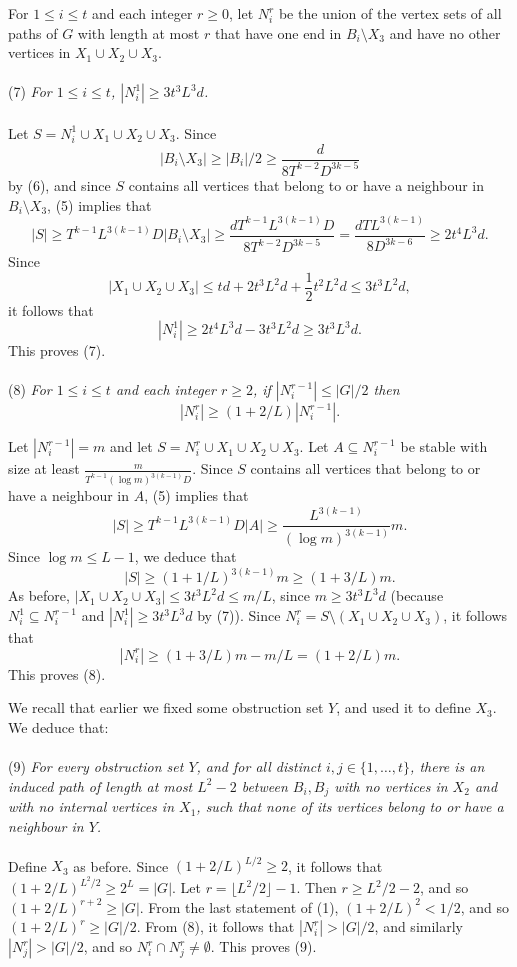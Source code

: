 \documentclass[titlepage,11pt]{article}
\def\LL{,\ldots,}
\begin{document}
For $1\le i\le t$ and each integer $r\ge 0$, let $N^r_i$ be the union of the vertex sets of all paths of $G$ with length at most $r$
that have one end in $B_i\setminus X_3$ and have  no other vertices in $X_1\cup X_2\cup X_3$.
\\
\\
(7) {\em For $1\le i\le t$, 
$|N_i^1|\ge 3t^3L^3d$.}
\\
\\
Let $S=N_i^1\cup X_1\cup X_2\cup X_3$. Since 
$$|B_i\setminus X_3|\ge |B_i|/2\ge \frac{d}{8T^{k-2}D^{3k-5}}$$ by (6), 
and since $S$ contains all vertices that belong to or have a neighbour in $B_i\setminus X_3$,
(5) implies that 
$$|S|\ge T^{k-1}L^{3(k-1)}D|B_i\setminus X_3|\ge \frac{dT^{k-1}L^{3(k-1)}D}{8T^{k-2}D^{3k-5}}=\frac{dTL^{3(k-1)}}{8D^{3k-6}}\ge 2t^4L^3d.$$
Since 
$$|X_1\cup X_2\cup X_3|\le td +  2t^3L^2d + \frac12 t^2L^2d\le 3t^3L^2d,$$
it follows that 
$$|N_i^1|\ge 2t^4L^3d - 3t^3L^2d\ge 3t^3L^3d.$$
This proves (7).
\\
\\
(8) {\em For $1\le i\le t$ and each integer $r\ge 2$, if $|N_i^{r-1}|\le |G|/2$ then 
$$|N^r_i|\ge \left(1+2/L\right)|N_i^{r-1}|.$$
}

\noindent
Let $|N_i^{r-1}|=m$ and let $S=N_i^{r}\cup X_1\cup X_2\cup X_3$. Let $A\subseteq N_i^{r-1}$ be stable with size at least 
$\frac{m}{T^{k-1}(\log m)^{3(k-1)}D}$. Since $S$ contains all vertices that belong to or have a neighbour in $A$, (5) implies that
$$|S|\ge T^{k-1}L^{3(k-1)}D|A|\ge \frac{L^{3(k-1)}}{(\log m)^{3(k-1)}}m.$$
Since $\log m\le L-1$, we deduce that 
$$|S|\ge \left(1+1/L\right)^{3(k-1)}m\ge (1+3/L)m.$$
As before, $|X_1\cup X_2\cup X_3|\le 3t^3L^2d\le m/L$, since
$m\ge 3t^3L^3d$ (because $N^1_i\subseteq N^{r-1}_i$ and $|N^1_i|\ge 3t^3L^3d$ by (7)).
Since
$N_i^r= S\setminus (X_1\cup X_2\cup X_3)$, it follows that 
$$|N_i^r|\ge \left(1+3/L\right)m-m/L= \left(1+2/L\right)m.$$
This proves (8).

\bigskip
We recall that earlier we fixed some obstruction set $Y$, and used it to define $X_3$. We deduce that:
\\
\\
(9) {\em For every obstruction set $Y$, and for all distinct $i,j\in \{1\LL t\}$, there is an induced path of length  
at most $L^2-2$
between $B_i,B_j$ with no vertices in $X_2$ and with no internal vertices in $X_1$, such that none of its vertices belong to or have a neighbour in $Y$.}
\\
\\
Define $X_3$ as before. 
Since $\left(1+2/L\right)^{L/2}\ge 2$, it follows that 
$\left(1+2/L\right)^{L^2/2}\ge 2^L=|G|$. Let $r=\lfloor L^2/2\rfloor-1$. Then $r\ge L^2/2-2$, and so 
$\left(1+2/L\right)^{r+2}\ge |G|$. From the last statement of (1), $\left(1+2/L\right)^2< 1/2$, and so 
$\left(1+2/L\right)^{r}\ge |G|/2$. From (8), it follows that $|N_i^r|>|G|/2$, and similarly $|N_j^r|>|G|/2$, and so $N_i^r\cap N_j^r\ne \emptyset$. This proves (9).
\end{document}
